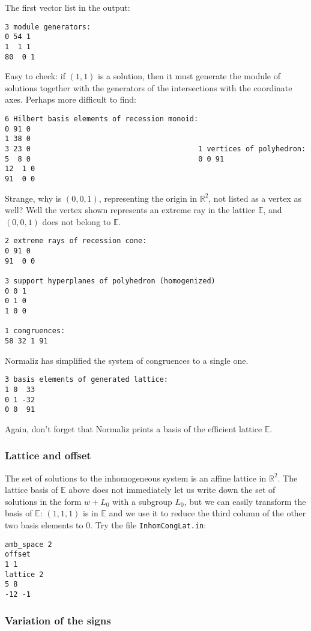 \documentclass[12pt,a4paper]{scrartcl}
\theoremstyle{definition}
\def\RR{{\mathbb R}}
\def\EE{{\mathbb E}}
\begin{document}
The first vector list in the output:

\begin{Verbatim}
3 module generators:
0 54 1
1  1 1
80  0 1
\end{Verbatim}
Easy to check: if $(1,1)$ is a solution, then it must generate the module of solutions together with the generators of the intersections with the coordinate axes. Perhaps more difficult to find:
\begin{Verbatim}
6 Hilbert basis elements of recession monoid:
0 91 0
1 38 0
3 23 0                                       1 vertices of polyhedron:
5  8 0                                       0 0 91
12  1 0
91  0 0
\end{Verbatim}
Strange, why is $(0,0,1)$, representing the origin in $\RR^2$, not listed as a vertex as well?
Well the vertex shown represents an extreme ray in the lattice $\EE$, and $(0,0,1)$ does not belong to $\EE$.

\begin{Verbatim}
2 extreme rays of recession cone:
0 91 0
91  0 0

3 support hyperplanes of polyhedron (homogenized)
0 0 1
0 1 0
1 0 0

1 congruences:
58 32 1 91
\end{Verbatim}
Normaliz has simplified the system of congruences to a single one.
\begin{Verbatim}
3 basis elements of generated lattice:
1 0  33
0 1 -32
0 0  91
\end{Verbatim}
Again, don't forget that Normaliz prints a basis of the efficient lattice $\EE$.

\subsubsection{Lattice and offset}\label{offset_ex}

The set of solutions to the inhomogeneous system is an affine lattice in $\RR^2$. The lattice basis of $\EE$ above does not immediately let us write down the set of solutions in the form $w+L_0$ with a subgroup $L_0$, but we can easily transform the basis of $\EE$: $(1,1,1)$ is in $\EE$ and we use it to reduce the third column of the other two basis elements to $0$. Try the file \verb|InhomCongLat.in|:

\begin{Verbatim}
amb_space 2
offset
1 1
lattice 2
5 8
-12 -1
\end{Verbatim}


\subsubsection{Variation of the signs}\label{sign_ex}
\end{document}
